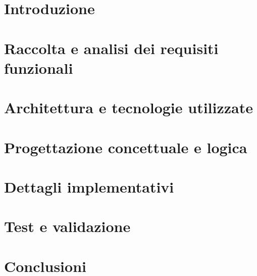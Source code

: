 \frontmatter
\maketitle
\dedication{
  Placeholder
}

\tableofcontents

\mainmatter

\chapter{Introduzione}


\chapter{Raccolta e analisi dei requisiti funzionali}


\chapter{Architettura e tecnologie utilizzate}


\chapter{Progettazione concettuale e logica}


\chapter{Dettagli implementativi}


\chapter{Test e validazione}


\chapter{Conclusioni}


\backmatter
